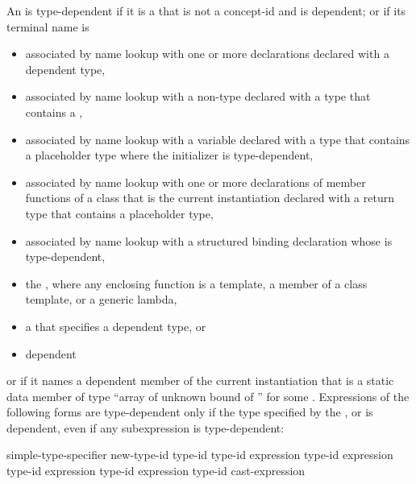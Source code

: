 \pnum
An  is type-dependent
if it is a  that is not a concept-id and is dependent;
or if its terminal name is
\begin{itemize}
\item
associated by name lookup with one or more declarations
declared with a dependent type,
\item
associated by name lookup with
a non-type 
declared with a type
that contains a ,
\item
associated by name lookup with
a variable declared with a type that contains a placeholder type
where the initializer is type-dependent,
\item
associated by name lookup with one or more
declarations of member functions of a class that is the current instantiation
declared with a return type that contains a placeholder type,
\item
associated by name lookup with
a structured binding declaration whose
 is type-dependent,
\item
the
, where any enclosing function is a
template, a member of a class template, or a generic lambda,
\item
a  that specifies a dependent type, or
\item
dependent
\end{itemize}
or if it names a dependent member of the current instantiation that is a static
data member of type
``array of unknown bound of '' for some .
Expressions of the following forms are type-dependent only if the type
specified by the
,
or
is dependent, even if any subexpression is type-dependent:
\begin{ncsimplebnf}
simple-type-specifier \terminal{(}  \terminal{)}\br
\opt{\terminal{::}}   new-type-id \br
\opt{\terminal{::}}   \terminal{(} type-id \terminal{)} \br
{} \terminal{<} type-id \terminal{>} \terminal{(} expression \terminal{)}\br
{} \terminal{<} type-id \terminal{>} \terminal{(} expression \terminal{)}\br
{} \terminal{<} type-id \terminal{>} \terminal{(} expression \terminal{)}\br
{} \terminal{<} type-id \terminal{>} \terminal{(} expression \terminal{)}\br
\terminal{(} type-id \terminal{)} cast-expression
\end{ncsimplebnf}

